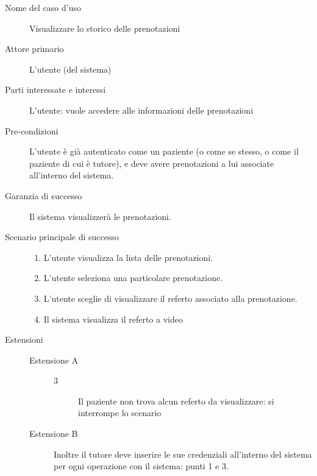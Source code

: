 \begin{description}
\item[Nome del caso d'uso]
        Visualizzare lo storico delle prenotazioni

\item[Attore primario]
        L'utente (del sistema)

\item[Parti interessate e interessi]
        L'utente: vuole accedere alle informazioni delle prenotazioni

\item[Pre-condizioni]
        L'utente è già autenticato come un paziente (o come se stesso, o come il 
        paziente di cui è tutore), e deve avere prenotazioni a lui associate
        all'interno del sistema.

\item[Garanzia di successo]
        Il sistema visualizzerà le prenotazioni.

\item[Scenario principale di successo]
\begin{enumerate}
\item L'utente visualizza la lista delle prenotazioni.
\item L'utente seleziona una particolare prenotazione.
\item L'utente sceglie di visualizzare il referto associato alla prenotazione.
\item Il sistema visualizza il referto a video
\end{enumerate}

\item[Estensioni]


\begin{description}
	\item[Estensione A]
	\medskip
	\begin{description}
	\item[3]
	Il paziente non trova alcun referto da visualizzare: si interrompe lo
	scenario
	\end{description}
	
\end{description}

\begin{description}
	\item[Estensione B]
	\medskip
	
	Inoltre il tutore deve inserire le sue credenziali 
	all'interno del sistema per ogni operazione con il sistema: punti 1 e 3.
	
\end{description}


\end{description}
